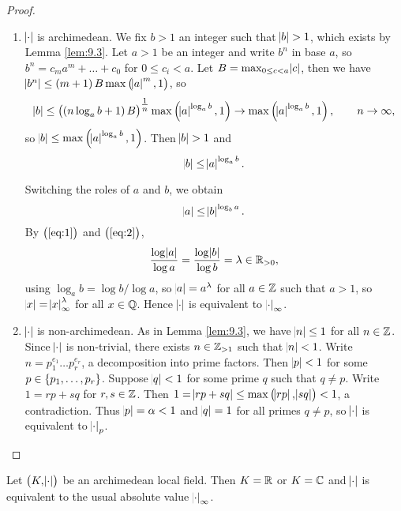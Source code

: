 \begin{proof}
\hfill
\begin{enumerate}[leftmargin=0.5in, label=Case \arabic*.]
\item $ \abs{\cdot} $ is archimedean. We fix $ b > 1 $ an integer such that $ \abs{b} > 1 $, which exists by Lemma \ref{lem:9.3}. Let $ a > 1 $ be an integer and write $ b^n $ in base $ a $, so $ b^n = c_ma^m + \dots + c_0 $ for $ 0 \le c_i < a $. Let $ B = \max_{0 \le c < a} \abs{c} $, then we have $ \abs{b^n} \le \br{m + 1}B\max\br{\abs{a}^m, 1} $, so
$$ \abs{b} \le \br{\br{n\log_a b + 1}B}^{\tfrac{1}{n}}\max\br{\abs{a}^{\log_a b}, 1} \to \max\br{\abs{a}^{\log_a b}, 1}, \qquad n \to \infty, $$
so $ \abs{b} \le \max\br{\abs{a}^{\log_a b}, 1} $. Then $ \abs{b} > 1 $ and
\begin{equation}
\label{eq:1}
\abs{b} \le \abs{a}^{\log_a b}.
\end{equation}

\pagebreak

Switching the roles of $ a $ and $ b $, we obtain
\begin{equation}
\label{eq:2}
\abs{a} \le \abs{b}^{\log_b a}.
\end{equation}
By $ \br{\ref{eq:1}} $ and $ \br{\ref{eq:2}} $,
$$ \dfrac{\log \abs{a}}{\log a} = \dfrac{\log \abs{b}}{\log b} = \lambda \in \mathbb{R}_{> 0}, $$
using $ \log_a b = \log b / \log a $, so $ \abs{a} = a^\lambda $ for all $ a \in \mathbb{Z} $ such that $ a > 1 $, so $ \abs{x} = \abs{x}_\infty^\lambda $ for all $ x \in \mathbb{Q} $. Hence $ \abs{\cdot} $ is equivalent to $ \abs{\cdot}_\infty $.
\item $ \abs{\cdot} $ is non-archimedean. As in Lemma \ref{lem:9.3}, we have $ \abs{n} \le 1 $ for all $ n \in \mathbb{Z} $. Since $ \abs{\cdot} $ is non-trivial, there exists $ n \in \mathbb{Z}_{> 1} $ such that $ \abs{n} < 1 $. Write $ n = p_1^{e_1} \dots p_r^{e_r} $, a decomposition into prime factors. Then $ \abs{p} < 1 $ for some $ p \in \cbr{p_1, \dots, p_r} $. Suppose $ \abs{q} < 1 $ for some prime $ q $ such that $ q \ne p $. Write $ 1 = rp + sq $ for $ r, s \in \mathbb{Z} $. Then $ 1 = \abs{rp + sq} \le \max\br{\abs{rp}, \abs{sq}} < 1 $, a contradiction. Thus $ \abs{p} = \alpha < 1 $ and $ \abs{q} = 1 $ for all primes $ q \ne p $, so $ \abs{\cdot} $ is equivalent to $ \abs{\cdot}_p $.
\end{enumerate}
\end{proof}

\begin{theorem}
\label{thm:9.6}
Let $ \br{K, \abs{\cdot}} $ be an archimedean local field. Then $ K = \mathbb{R} $ or $ K = \mathbb{C} $ and $ \abs{\cdot} $ is equivalent to the usual absolute value $ \abs{\cdot}_\infty $.
\end{theorem}

